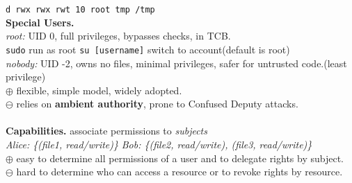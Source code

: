 \documentclass[main.tex]{subfiles}
\begin{document}
\begin{minipage}[t]{0.495\textwidth}
	\texttt{d rwx rwx rwt 10 root tmp /tmp}\\
	\textbf{Special Users.}\\
	\textit{root:} UID 0, full privileges, bypasses checks, in TCB.\\
	\texttt{sudo} run as root \quad \texttt{su [username]} switch to account(default is root)\\
	\textit{nobody:} UID -2, owns no files, minimal privileges, safer for untrusted code.(least privilege)\\
	$\oplus$ flexible, simple model, widely adopted.\\
	$\ominus$ relies on \textbf{ambient authority}, prone to Confused Deputy attacks.\\[1px]
	\\[1px]
	\noindent \textbf{Capabilities.} associate permissions to \textit{subjects}\\
	\textit{Alice: \{(file1, read/write)\}} \; \textit{Bob: \{(file2, read/write), (file3, read/write)\}}
	\\
	$\oplus$ easy to determine all permissions of a user and to delegate rights by subject.\\
	$\ominus$ hard to determine who can access a resource or to revoke rights by resource.
\end{minipage}
\footnotesize
\newpage
\end{document}
